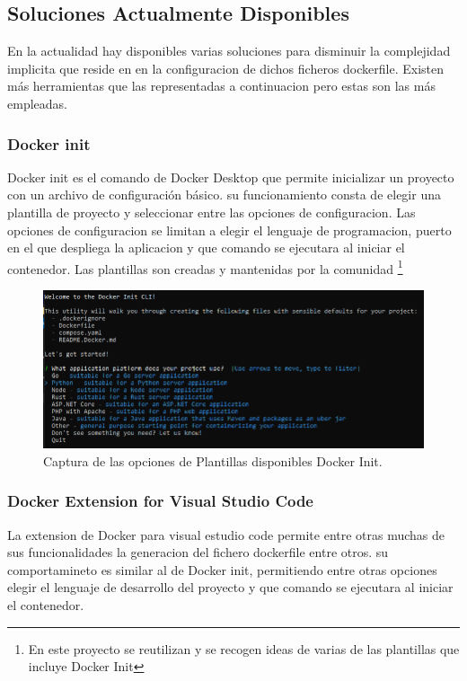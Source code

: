 \documentclass[12pt, a4paper, twoside]{article}
\begin{document}
\subsection{Soluciones Actualmente Disponibles}
En la actualidad hay disponibles varias soluciones para disminuir la complejidad implicita que reside en en la configuracion de dichos ficheros dockerfile. Existen más herramientas que las representadas a continuacion pero estas son las más empleadas.
\subsubsection{Docker init}
Docker init es el comando de Docker Desktop \cite{docker_desktop} que permite inicializar un proyecto con un archivo de configuración básico.
su funcionamiento consta de elegir una plantilla de proyecto y seleccionar entre las opciones de configuracion.
Las opciones de configuracion se limitan a elegir el lenguaje de programacion, puerto en el que despliega la aplicacion y que comando se ejecutara al iniciar el contenedor.
Las plantillas son creadas y mantenidas por la comunidad \footnote{En este proyecto se reutilizan y se recogen ideas de varias de las plantillas que incluye Docker Init}
\begin{figure}[ht]
  \centering
    \includegraphics[width=1\textwidth]{Docker Init.png}
  \caption{Captura de las opciones de Plantillas disponibles Docker Init.}
\end{figure}

\newpage
\subsubsection{Docker Extension for Visual Studio Code}
La extension de Docker para visual estudio code \cite{vscode_containers_overview} permite entre otras muchas de sus funcionalidades la generacion del fichero dockerfile entre otros.
su comportamineto es similar al de Docker init, permitiendo entre otras opciones elegir el lenguaje de desarrollo del proyecto y que comando se ejecutara al iniciar el contenedor.
\end{document}
